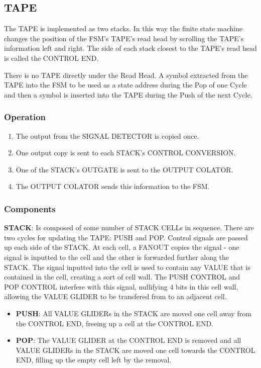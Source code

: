 \documentclass{article}
\begin{document}
\subsection{TAPE}


The TAPE is implemented as two stacks. In this way the finite state machine changes the position of the FSM's TAPE's read head by scrolling the TAPE's information left and right. The side of each stack closest to the TAPE's read head is called the CONTROL END.





There is no TAPE directly under the Read Head. A symbol extracted from the TAPE  into the FSM to be used as a state address during the Pop of one Cycle and then a symbol is inserted into the TAPE during the Push of the next Cycle.


\subsubsection{Operation}\begin{enumerate}
\item The output from the SIGNAL DETECTOR is copied once.


\item One output copy is sent to each STACK's CONTROL CONVERSION.


\item One of the STACK's OUTGATE is sent to the OUTPUT COLATOR.


\item The OUTPUT COLATOR sends this information to the FSM.

\end{enumerate}\subsubsection{Components}
\noindent\textbf{STACK}: Is composed of some number of STACK CELLs in sequence. There are two cycles for updating the TAPE: PUSH and POP. Control signals are passed up each side of the STACK. At each cell, a FANOUT copies the signal - one signal is inputted to the cell and the other is forwarded further along the STACK. The signal inputted into the cell is used to contain any VALUE that is contained in the cell, creating a sort of cell wall. The PUSH CONTROL and POP CONTROL interfere with this signal, nullifying 4 bits in this cell wall, allowing the VALUE GLIDER to be transfered from to an adjacent cell.
\begin{itemize}
\item  \textbf{PUSH}: All VALUE GLIDERs in the STACK are moved one cell away from the CONTROL END, freeing up a cell at the CONTROL END.
 

\item  \textbf{POP}: The VALUE GLIDER at the CONTROL END is removed and all VALUE GLIDERs in the STACK are moved one cell towards the CONTROL END, filling up the empty cell left by the removal.
 
\end{itemize}
\vspace{1em}
\end{document}
